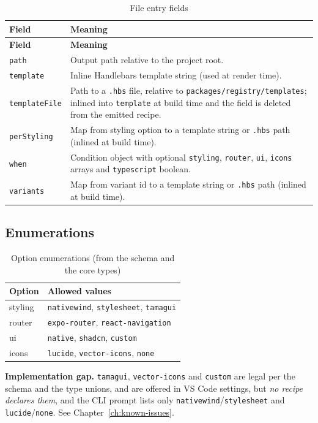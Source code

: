 \begin{longtable}{@{}L{2.7cm}L{11.1cm}@{}}
\caption{File entry fields}\\
\toprule
\textbf{Field} & \textbf{Meaning} \\
\midrule
\endfirsthead
\toprule
\textbf{Field} & \textbf{Meaning} \\
\midrule
\endhead
\texttt{path} & Output path relative to the project root. \\
\texttt{template} & Inline Handlebars template string (used at render time). \\
\texttt{templateFile} & Path to a \texttt{.hbs} file, relative to
\texttt{packages/registry/templates}; inlined into \texttt{template} at build
time and the field is deleted from the emitted recipe. \\
\texttt{perStyling} & Map from styling option to a template string or \texttt{.hbs}
path (inlined at build time). \\
\texttt{when} & Condition object with optional \texttt{styling}, \texttt{router},
\texttt{ui}, \texttt{icons} arrays and \texttt{typescript} boolean. \\
\texttt{variants} & Map from variant id to a template string or \texttt{.hbs} path
(inlined at build time). \\
\bottomrule
\end{longtable}

\subsection*{Enumerations}

\begin{table}[H]
\centering
\caption{Option enumerations (from the schema and the core types)}
\begin{tabular}{@{}L{3cm}L{10.8cm}@{}}
\toprule
\textbf{Option} & \textbf{Allowed values} \\
\midrule
styling & \texttt{nativewind}, \texttt{stylesheet}, \texttt{tamagui} \\
router & \texttt{expo-router}, \texttt{react-navigation} \\
ui & \texttt{native}, \texttt{shadcn}, \texttt{custom} \\
icons & \texttt{lucide}, \texttt{vector-icons}, \texttt{none} \\
\bottomrule
\end{tabular}
\end{table}

\textbf{Implementation gap.} \texttt{tamagui}, \texttt{vector-icons} and
\texttt{custom} are legal per the schema and the type unions, and are offered in VS
Code settings, but \emph{no recipe declares them}, and the CLI prompt lists only
\texttt{nativewind}/\texttt{stylesheet} and \texttt{lucide}/\texttt{none}. See
Chapter~\ref{ch:known-issues}.

